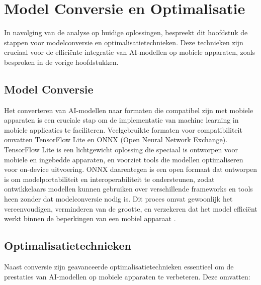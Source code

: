 \section{Model Conversie en Optimalisatie}

In navolging van de analyse op huidige oplossingen, bespreekt dit hoofdstuk de stappen voor modelconversie en optimalisatietechnieken. Deze technieken zijn cruciaal voor de efficiënte integratie van AI-modellen op mobiele apparaten, zoals besproken in de vorige hoofdstukken.


\subsection{Model Conversie}

Het converteren van AI-modellen naar formaten die compatibel zijn met mobiele apparaten is een cruciale stap om de implementatie van machine learning in mobiele applicaties te faciliteren. Veelgebruikte formaten voor compatibiliteit omvatten TensorFlow Lite en ONNX (Open Neural Network Exchange). TensorFlow Lite is een lichtgewicht oplossing die speciaal is ontworpen voor mobiele en ingebedde apparaten, en voorziet tools die modellen optimaliseren voor on-device uitvoering. ONNX daarentegen is een open formaat dat ontworpen is om modelportabiliteit en interoperabiliteit te ondersteunen, zodat ontwikkelaars modellen kunnen gebruiken over verschillende frameworks en tools heen zonder dat modelconversie nodig is. Dit proces omvat gewoonlijk het vereenvoudigen, verminderen van de grootte, en verzekeren dat het model efficiënt werkt binnen de beperkingen van een mobiel apparaat \autocite{Dalwadi2021}.

\subsection{Optimalisatietechnieken}

Naast conversie zijn geavanceerde optimalisatietechnieken essentieel om de prestaties van AI-modellen op mobiele apparaten te verbeteren. Deze omvatten:

